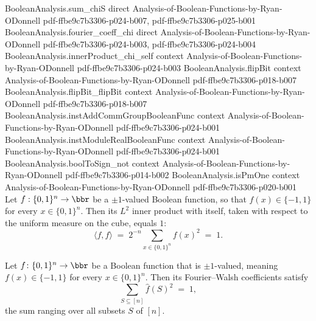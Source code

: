 \begin{lemma}
\proofstep
  {BooleanAnalysis.sum_chiS}
  {direct}
  {Analysis-of-Boolean-Functions-by-Ryan-ODonnell}
  {pdf-ffbe9c7b3306-p024-b007,
    pdf-ffbe9c7b3306-p025-b001}
\proofstep
  {BooleanAnalysis.fourier_coeff_chi}
  {direct}
  {Analysis-of-Boolean-Functions-by-Ryan-ODonnell}
  {pdf-ffbe9c7b3306-p024-b003,
    pdf-ffbe9c7b3306-p024-b004}
\proofstep
  {BooleanAnalysis.innerProduct_chi_self}
  {context}
  {Analysis-of-Boolean-Functions-by-Ryan-ODonnell}
  {pdf-ffbe9c7b3306-p024-b003}
\proofstep
  {BooleanAnalysis.flipBit}
  {context}
  {Analysis-of-Boolean-Functions-by-Ryan-ODonnell}
  {pdf-ffbe9c7b3306-p018-b007}
\proofstep
  {BooleanAnalysis.flipBit_flipBit}
  {context}
  {Analysis-of-Boolean-Functions-by-Ryan-ODonnell}
  {pdf-ffbe9c7b3306-p018-b007}
\proofstep
  {BooleanAnalysis.instAddCommGroupBooleanFunc}
  {context}
  {Analysis-of-Boolean-Functions-by-Ryan-ODonnell}
  {pdf-ffbe9c7b3306-p024-b001}
\proofstep
  {BooleanAnalysis.instModuleRealBooleanFunc}
  {context}
  {Analysis-of-Boolean-Functions-by-Ryan-ODonnell}
  {pdf-ffbe9c7b3306-p024-b001}
\proofstep
  {BooleanAnalysis.boolToSign_not}
  {context}
  {Analysis-of-Boolean-Functions-by-Ryan-ODonnell}
  {pdf-ffbe9c7b3306-p014-b002}
\proofstep
  {BooleanAnalysis.isPmOne}
  {context}
  {Analysis-of-Boolean-Functions-by-Ryan-ODonnell}
  {pdf-ffbe9c7b3306-p020-b001}
Let $f : \{0,1\}^n \to \bbr$ be a $\pm 1$-valued Boolean function, so that $f(x) \in
\{-1, 1\}$ for every $x \in \{0,1\}^n$. Then its $L^2$ inner product with itself, taken
with respect to the uniform measure on the cube, equals $1$:
\[
  \langle f, f \rangle \;=\; 2^{-n}\sum_{x \in \{0,1\}^n} f(x)^2 \;=\; 1.
\]
\end{lemma}

\begin{lemma}
\label{BooleanAnalysis.parseval_pm_one}
\leanok
{}
Let $f \colon \{0,1\}^n \to \bbr$ be a Boolean function that is $\pm 1$-valued, meaning
$f(x) \in \{-1,1\}$ for every $x \in \{0,1\}^n$. Then its Fourier--Walsh coefficients
satisfy
\[
  \sum_{S \subseteq [n]} \hat f(S)^2 \;=\; 1,
\]
the sum ranging over all subsets $S$ of $[n]$.
\end{lemma}

